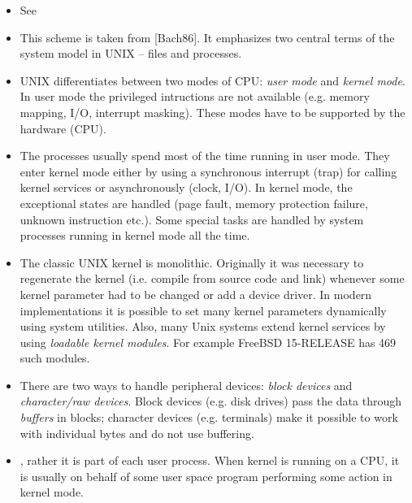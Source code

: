 \begin{itemize}
\item See 
\end{itemize}


\begin{slide}

\end{slide}

\begin{itemize}
\item This scheme is taken from [Bach86]. It emphasizes two central terms
of the system model in UNIX -- files and processes.
\item UNIX differentiates between two modes of CPU: \emph{user mode} and
\emph{kernel mode}. In user mode the privileged intructions are not
available (e.g. memory mapping, I/O, interrupt masking). These modes have to
be supported by the hardware (CPU).
\item The processes usually spend most of the time running in user mode.
They enter kernel mode either by using a synchronous interrupt (trap) for
calling kernel services or asynchronously (clock, I/O). In kernel mode,
the exceptional states are handled (page fault, memory protection failure,
unknown instruction etc.). Some special tasks are handled by system processes
running in kernel mode all the time.
\item The classic UNIX kernel is monolithic. Originally it was necessary to
regenerate the kernel (i.e. compile from source code and link) whenever some
kernel parameter had to be changed or add a device driver. In modern
implementations it is possible to set many kernel parameters dynamically using
system utilities. Also, many Unix systems extend kernel services by using
\emph{loadable kernel modules}. For example FreeBSD 15-RELEASE has 469 such
modules.
\item There are two ways to handle peripheral devices:
\emph{block devices} and \emph{character/raw devices}. Block devices (e.g.
disk drives) pass the data through \emph{buffers} in blocks; character devices
(e.g. terminals) make it possible to work with individual bytes and do not use
buffering.
\item {}, rather it is part of each
user process. When kernel is running on a CPU, it is usually on behalf of some
user space program performing some action in kernel mode.
\end{itemize}


